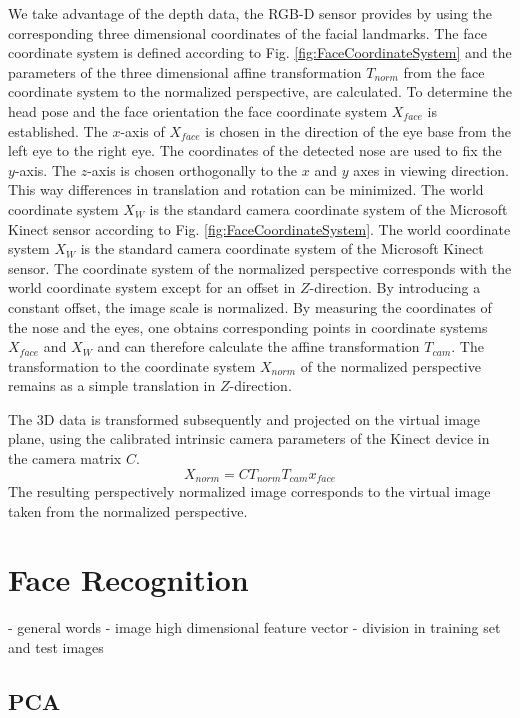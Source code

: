 We take advantage of the depth data, the RGB-D sensor provides by using the corresponding 
three dimensional coordinates of the facial landmarks.
The face coordinate system is defined according to Fig. \ref{fig:FaceCoordinateSystem} and the parameters of the three dimensional affine transformation $T_{norm}$ from the face coordinate system to the normalized perspective, are calculated.
To determine the head pose and the face orientation the face coordinate system $X_{face}$ is established.
The $x$-axis of $X_{face}$ is chosen in the direction of the eye base from the left eye to the right eye.
The coordinates of the detected nose are used to fix the $y$-axis. The $z$-axis is chosen orthogonally to the $x$ and $y$ axes in viewing direction.
This way differences in translation and rotation can be minimized.
The world coordinate system $X_W$ is the standard camera coordinate system of the Microsoft Kinect sensor according to Fig. \ref{fig:FaceCoordinateSystem}.
The world coordinate system $X_W$ is the standard camera coordinate system of the Microsoft Kinect sensor.
The coordinate system of the normalized perspective corresponds with the world coordinate system except for an offset in $Z$-direction.
By introducing a constant offset, the image scale is normalized.
By measuring the coordinates of the nose and the eyes, one obtains corresponding points in coordinate systems $X_{face}$ and $X_W$ and can therefore calculate the affine transformation $T_{cam}$.
The transformation to the coordinate system $X_{norm}$ of the normalized perspective remains as a simple translation in $Z$-direction.

The 3D data is transformed subsequently and projected on the virtual image plane, using the calibrated intrinsic camera parameters of the Kinect device in the camera matrix $C$.
\begin{equation}
  X_{norm}=C T_{norm}T_{cam}x_{face}
\end{equation}
The resulting perspectively normalized image corresponds to the virtual image taken from the normalized perspective.

\section{Face Recognition}
- general words
- image high dimensional feature vector
- division in training set and test images
\subsection{PCA}
\todo{}

